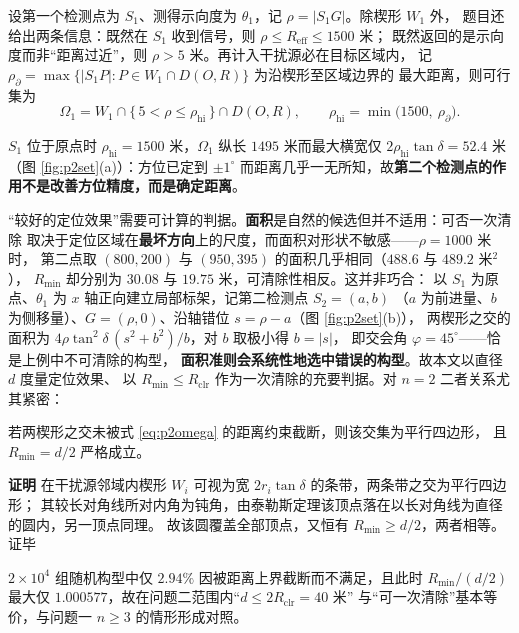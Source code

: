 \documentclass[withoutpreface, bwprint]{cumcmthesis}
\renewenvironment{proof}{\par\noindent\textbf{证明}\quad}{\hfill 证毕\par\medskip}
\begin{document}
设第一个检测点为 $S_1$、测得示向度为 $\theta_1$，记 $\rho=|S_1G|$。除楔形 $W_1$ 外，
题目还给出两条信息：既然在 $S_1$ 收到信号，则 $\rho\le R_{\mathrm{eff}}\le1500$ 米；
既然返回的是示向度而非“距离过近”，则 $\rho>5$ 米。再计入干扰源必在目标区域内，
记 $\rho_\partial=\max\{\lvert S_1P\rvert: P\in W_1\cap D(O,R)\}$ 为沿楔形至区域边界的
最大距离，则可行集为
\begin{equation}
  \Omega_1 = W_1 \cap \{\,5<\rho\le\rho_{\mathrm{hi}}\,\}\cap D(O,R),
  \qquad
  \rho_{\mathrm{hi}}=\min\bigl(1500,\ \rho_\partial\bigr).
  \label{eq:p2omega}
\end{equation}

$S_1$ 位于原点时 $\rho_{\mathrm{hi}}=1500$ 米，$\Omega_1$ 纵长 $1495$ 米而最大横宽仅
$2\rho_{\mathrm{hi}}\tan\delta=52.4$ 米（图 \ref{fig:p2set}(a)）：方位已定到 $\pm1^\circ$
而距离几乎一无所知，故\textbf{第二个检测点的作用不是改善方位精度，而是确定距离}。

“较好的定位效果”需要可计算的判据。\textbf{面积}是自然的候选但并不适用：可否一次清除
取决于定位区域在\textbf{最坏方向}上的尺度，而面积对形状不敏感——$\rho=1000$ 米时，
第二点取 $(800,200)$ 与 $(950,395)$ 的面积几乎相同（$488.6$ 与 $489.2$ 米$^2$），
$R_{\min}$ 却分别为 $30.08$ 与 $19.75$ 米，可清除性相反。这并非巧合：
以 $S_1$ 为原点、$\theta_1$ 为 $x$ 轴正向建立局部标架，记第二检测点 $S_2=(a,b)$
（$a$ 为前进量、$b$ 为侧移量）、$G=(\rho,0)$、沿轴错位 $s=\rho-a$（图 \ref{fig:p2set}(b)），
两楔形之交的面积为 $4\rho\tan^2\!\delta\,(s^2+b^2)/b$，对 $b$ 取极小得 $b=|s|$，
即交会角 $\varphi=45^\circ$——恰是上例中不可清除的构型，
\textbf{面积准则会系统性地选中错误的构型}。故本文以直径 $d$ 度量定位效果、
以 $R_{\min}\le R_{\mathrm{clr}}$ 作为一次清除的充要判据。对 $n=2$ 二者关系尤其紧密：

\begin{lemma}[两楔形之交的覆盖性]
\label{lem:p2para}
若两楔形之交未被式 \eqref{eq:p2omega} 的距离约束截断，则该交集为平行四边形，
且 $R_{\min}=d/2$ 严格成立。
\end{lemma}

\begin{proof}
在干扰源邻域内楔形 $W_i$ 可视为宽 $2r_i\tan\delta$ 的条带，两条带之交为平行四边形；
其较长对角线所对内角为钝角，由泰勒斯定理该顶点落在以长对角线为直径的圆内，另一顶点同理。
故该圆覆盖全部顶点，又恒有 $R_{\min}\ge d/2$，两者相等。
\end{proof}

$2\times10^4$ 组随机构型中仅 $2.94\%$ 因被距离上界截断而不满足，且此时
$R_{\min}/(d/2)$ 最大仅 $1.000577$，故在问题二范围内“$d\le 2R_{\mathrm{clr}}=40$ 米”
与“可一次清除”基本等价，与问题一 $n\ge3$ 的情形形成对照。
\end{document}
